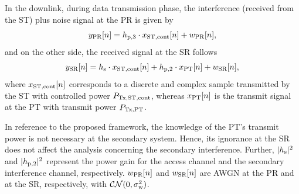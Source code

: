 In the downlink, during data transmission phase, the interference (received from the ST) plus noise signal at the PR is given by
\begin{equation}
y_{\text{PR}}[n] = h_{\text{p,3}}  \cdot x_{\text{ST,cont}}[n] + w_{\text{PR}}[n],
\label{eq_US:sys_mod_pr}
\end{equation}
and on the other side, the received signal at the SR follows 
\begin{equation}
y_{\text{SR}}[n] = h_{\text{s}} \cdot x_{\text{ST,cont}}[n] + h_{\text{p,2}} \cdot x_{\text{PT}}[n] + w_{\text{SR}}[n],
\label{eq_US:sys_mod_sr}
\end{equation}
where $x_{\text{ST,cont}}[n]$ corresponds to a discrete and complex sample transmitted by the ST with controlled power $P_{\text{Tx,ST,cont}}$, whereas $x_{\text{PT}}[n]$ is the transmit signal at the PT with transmit power $P_{\text{Tx,PT}}$. 

In reference to the proposed framework, the knowledge of the PT's transmit power is not necessary at the secondary system. Hence, its ignorance at the SR does not affect the analysis concerning the secondary interference. Further, $|h_{\text{s}}|^2$ and $|h_{\text{p,2}}|^2$ represent the power gain for the access channel and the secondary interference channel, respectively. $w_{\text{PR}}[n]$ and $w_{\text{SR}}[n]$ are AWGN at the PR and at the SR, respectively, with $\mathcal{CN}(0, \sigma^2_{\text{w}})$.%


